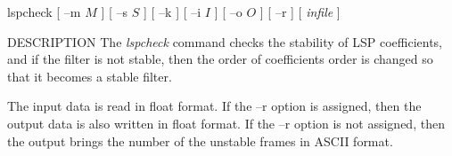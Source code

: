 % 
% 
% 
% 
%                                                                        
%

\begin{synopsis}
\item [lspcheck] [ --m $M$ ] [ --s $S$ ] [ --k ] [ --i $I$ ] [ --o $O$ ]
		[ --r ] [ {\em infile} ] 
\end{synopsis}

\begin{qsection}{DESCRIPTION}
The {\em lspcheck} command checks the stability of LSP coefficients,
and if the filter is not stable,
then the order of coefficients order is changed so that
it becomes a stable filter.
\par
The input data is read in float format.
If the --r option is assigned, then the output data is also
written in float format.
If the --r option is not assigned, then the output brings
the number of the unstable frames in ASCII format.
\end{qsection}

